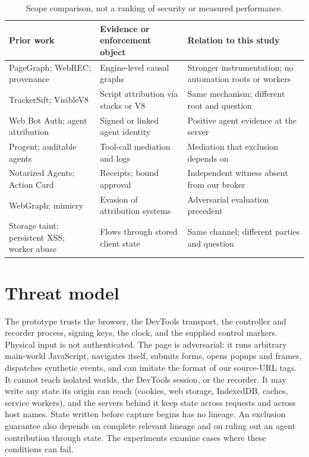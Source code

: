 \documentclass[11pt]{article}
\theoremstyle{definition}
\begin{document}
\begin{table}[tb]
\centering\footnotesize
\begin{tabularx}{\linewidth}{@{}>{\raggedright\arraybackslash}p{.27\linewidth}YY@{}}
\toprule
Prior work & Evidence or enforcement object & Relation to this study \\
\midrule
PageGraph; WebREC; provenance \cite{pagegraph,hantke2025,margo2009} & Engine-level causal graphs & Stronger instrumentation; no automation roots or workers \\
TrackerSift; VisibleV8 \cite{amjad2021trackersift,visiblev8} & Script attribution via stacks or V8 & Same mechanism; different root and question \\
Web Bot Auth; agent attribution \cite{webbotauth,chocron2026} & Signed or linked agent identity & Positive agent evidence at the server \\
Progent; auditable agents \cite{progent,nian2026auditable} & Tool-call mediation and logs & Mediation that exclusion depends on \\
Notarized Agents; Action Card \cite{figuera2026,irshad2026} & Receipts; bound approval & Independent witness absent from our broker \\
WebGraph; mimicry \cite{webgraph,goyal2023mimicry} & Evasion of attribution systems & Adversarial evaluation precedent \\
Storage taint; persistent XSS; worker abuse \cite{ahmad2023webstorage,steffens2019locals,chinprutthiwong2021sw} & Flows through stored client state & Same channel; different parties and question \\
\bottomrule
\end{tabularx}
\caption{Scope comparison, not a ranking of security or measured performance.}
\label{tab:related}
\end{table}

\section{Threat model}
The prototype trusts the browser, the DevTools transport, the controller and
recorder process, signing keys, the clock, and the supplied control markers.
Physical input is not authenticated. The page is adversarial: it runs arbitrary
main-world JavaScript, navigates itself, submits forms, opens popups and frames,
dispatches synthetic events, and can imitate the format of our source-URL tags.
It cannot reach isolated worlds, the DevTools session, or the recorder. It may
write any state its origin can reach (cookies, web storage, IndexedDB, caches,
service workers), and the servers behind it keep state across requests and
across host names. State written before capture begins has no lineage.
An exclusion guarantee also depends on complete relevant lineage and on ruling out an agent contribution through state. The experiments examine cases where these conditions can fail.
\end{document}
